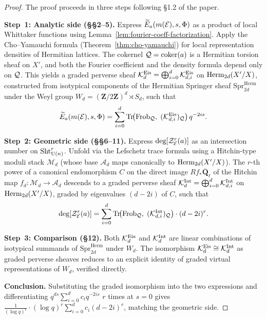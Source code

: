 \begin{proof}
  The proof proceeds in three steps following \S1.2 of the paper.

  \textbf{Step~1: Analytic side (\S\S2--5).}
  Express \(\widetilde{E}_a(m(\mathcal{E}), s, \Phi)\) as a product of local Whittaker
  functions using Lemma~\ref{lem:fourier-coeff-factorization}.  Apply the
  Cho--Yamauchi formula (Theorem~\ref{thm:cho-yamauchi}) for local representation
  densities of Hermitian lattices.  The cokernel \(\mathcal{Q} = \operatorname{coker}(a)\) is a Hermitian
  torsion sheaf on \(X'\), and both the Fourier coefficient and the density formula
  depend only on \(\mathcal{Q}\). This yields a graded perverse sheaf
  \(\mathcal{K}^{\mathrm{Eis}}_d = \bigoplus_{i=0}^d \mathcal{K}^{\mathrm{Eis}}_{d,i}\) on
  \(\operatorname{Herm}_{2d}(X'/X)\), constructed from isotypical components of the Hermitian
  Springer sheaf \(\mathrm{Spr}^{\mathrm{Herm}}_{2d}\) under the Weyl group
  \(W_d = (\mathbf{Z}/2\mathbf{Z})^d \rtimes S_d\), such that
  \[
    \widetilde{E}_a(m(\mathcal{E}), s, \Phi) = \sum_{i=0}^d
      \operatorname{Tr}\!\bigl(\operatorname{Frob}_{\mathcal{Q}},\; (\mathcal{K}^{\mathrm{Eis}}_{d,i})_{\mathcal{Q}}\bigr)\, q^{-2is}.
  \]

  \textbf{Step~2: Geometric side (\S\S6--11).}
  Express \(\deg[\mathcal{Z}_{\mathcal{E}}^r(a)]\) as an intersection number on \(\operatorname{Sht}_{\operatorname{U}(n)}^r\).
  Unfold via the Lefschetz trace formula using a Hitchin-type moduli stack
  \(\mathcal{M}_d\) (whose base \(\mathcal{A}_d\) maps canonically to
  \(\operatorname{Herm}_{2d}(X'/X)\)).  The \(r\)-th power of a canonical endomorphism \(C\) on
  the direct image \(Rf_*\overline{\mathbf{Q}}_\ell\) of the Hitchin map
  \(f_d : \mathcal{M}_d \to \mathcal{A}_d\) descends to a graded perverse sheaf
  \(\mathcal{K}^{\mathrm{Int}}_d = \bigoplus_{i=0}^d \mathcal{K}^{\mathrm{Int}}_{d,i}\) on
  \(\operatorname{Herm}_{2d}(X'/X)\), graded by eigenvalues \((d-2i)\) of \(C\), such that
  \[
    \deg[\mathcal{Z}_{\mathcal{E}}^r(a)] = \sum_{i=0}^d
      \operatorname{Tr}\!\bigl(\operatorname{Frob}_{\mathcal{Q}},\; (\mathcal{K}^{\mathrm{Int}}_{d,i})_{\mathcal{Q}}\bigr)\cdot (d-2i)^r.
  \]

  \textbf{Step~3: Comparison (\S12).}
  Both \(\mathcal{K}^{\mathrm{Eis}}_d\) and \(\mathcal{K}^{\mathrm{Int}}_d\) are linear combinations of
  isotypical summands of \(\mathrm{Spr}^{\mathrm{Herm}}_{2d}\) under \(W_d\). The
  isomorphism \(\mathcal{K}^{\mathrm{Eis}}_d \cong \mathcal{K}^{\mathrm{Int}}_d\) as graded perverse
  sheaves reduces to an explicit identity of graded virtual representations of \(W_d\),
  verified directly.

  \textbf{Conclusion.}
  Substituting the graded isomorphism into the two expressions and differentiating
  \(q^{ds} \sum_{i=0}^d c_i q^{-2is}\) \(r\) times at \(s = 0\) gives
  \(\frac{1}{(\log q)^r} \cdot (\log q)^r \sum_{i=0}^d c_i (d-2i)^r\), matching the
  geometric side.
\end{proof}


